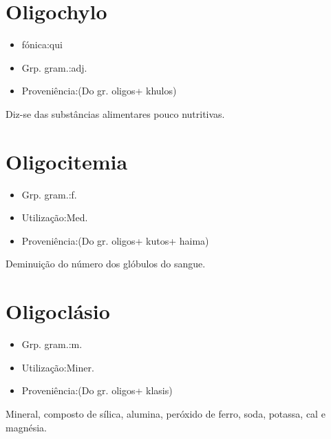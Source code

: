 \section{Oligochylo}
\begin{itemize}
\item {fónica:qui}
\end{itemize}
\begin{itemize}
\item {Grp. gram.:adj.}
\end{itemize}
\begin{itemize}
\item {Proveniência:(Do gr. \textunderscore oligos\textunderscore  + \textunderscore khulos\textunderscore )}
\end{itemize}
Diz-se das substâncias alimentares pouco nutritivas.
\section{Oligocitemia}
\begin{itemize}
\item {Grp. gram.:f.}
\end{itemize}
\begin{itemize}
\item {Utilização:Med.}
\end{itemize}
\begin{itemize}
\item {Proveniência:(Do gr. \textunderscore oligos\textunderscore  + \textunderscore kutos\textunderscore  + \textunderscore haima\textunderscore )}
\end{itemize}
Deminuição do número dos glóbulos do sangue.
\section{Oligoclásio}
\begin{itemize}
\item {Grp. gram.:m.}
\end{itemize}
\begin{itemize}
\item {Utilização:Miner.}
\end{itemize}
\begin{itemize}
\item {Proveniência:(Do gr. \textunderscore oligos\textunderscore  + \textunderscore klasis\textunderscore )}
\end{itemize}
Mineral, composto de sílica, alumina, peróxido de ferro, soda, potassa, cal e magnésia.

